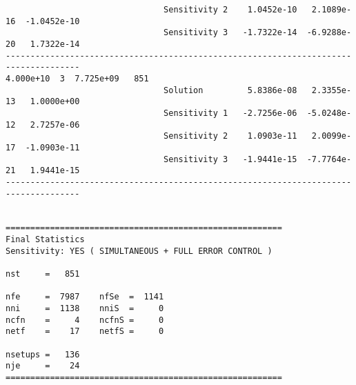\begin{verbatim}
                                Sensitivity 2    1.0452e-10   2.1089e-16  -1.0452e-10 
                                Sensitivity 3   -1.7322e-14  -6.9288e-20   1.7322e-14 
-------------------------------------------------------------------------------------
4.000e+10  3  7.725e+09   851
                                Solution         5.8386e-08   2.3355e-13   1.0000e+00 
                                Sensitivity 1   -2.7256e-06  -5.0248e-12   2.7257e-06 
                                Sensitivity 2    1.0903e-11   2.0099e-17  -1.0903e-11 
                                Sensitivity 3   -1.9441e-15  -7.7764e-21   1.9441e-15 
-------------------------------------------------------------------------------------


========================================================
Final Statistics
Sensitivity: YES ( SIMULTANEOUS + FULL ERROR CONTROL )

nst     =   851                

nfe     =  7987    nfSe  =  1141  
nni     =  1138    nniS  =     0  
ncfn    =     4    ncfnS =     0  
netf    =    17    netfS =     0

nsetups =   136                  
nje     =    24                  
========================================================
\end{verbatim}